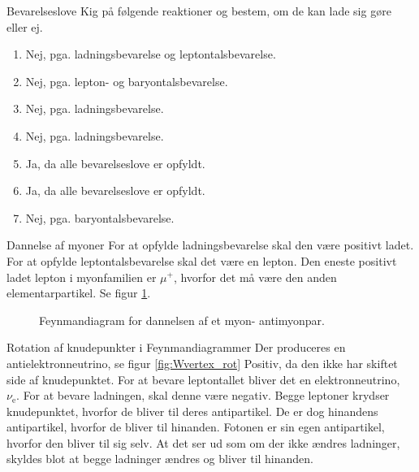 \begin{opgave}{Bevarelseslove}
    \opg Kig på følgende reaktioner og bestem, om de kan lade sig gøre eller ej.
    \begin{enumerate}
        \item Nej, pga. ladningsbevarelse og leptontalsbevarelse.
        \item Nej, pga. lepton- og baryontalsbevarelse.
        \item Nej, pga. ladningsbevarelse.
        \item Nej, pga. ladningsbevarelse.
        \item Ja, da alle bevarelseslove er opfyldt.
        \item Ja, da alle bevarelseslove er opfyldt.
        \item Nej, pga. baryontalsbevarelse.
    \end{enumerate}
\end{opgave}

\begin{opgave}{Dannelse af myoner}
    \opg For at opfylde ladningsbevarelse skal den være positivt ladet. For at opfylde leptontalsbevarelse skal det være en lepton. Den eneste positivt ladet lepton i myonfamilien er $\mu^+$, hvorfor det må være den anden elementarpartikel.
    \opg Se figur \ref{fig:myonpardannelse}.
\end{opgave}

\begin{figure} [h!]
        \centering
        \caption{Feynmandiagram for dannelsen af et myon- antimyonpar.}
        \label{fig:myonpardannelse}
    \end{figure}

\begin{opgave}{Rotation af knudepunkter i Feynmandiagrammer} \label{opg:rotation_af_Feynman}
    \opg Der produceres en antielektronneutrino, se figur \ref{fig:Wvertex_rot}
    \opg Positiv, da den ikke har skiftet side af knudepunktet.
    \opg For at bevare leptontallet bliver det en elektronneutrino, $\nu_\mathrm{e}.$
    \opg For at bevare ladningen, skal denne være negativ.
    \opg Begge leptoner krydser knudepunktet, hvorfor de bliver til deres antipartikel. De er dog hinandens antipartikel, hvorfor de bliver til hinanden. Fotonen er sin egen antipartikel, hvorfor den bliver til sig selv. At det ser ud som om der ikke ændres ladninger, skyldes blot at begge ladninger ændres og bliver til hinanden.
\end{opgave}

